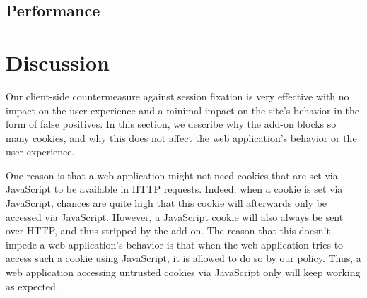 \subsection{Performance}\label{performance}

\section{Discussion}\label{discussion}

Our client-side countermeasure against session fixation is very effective with no impact on the user experience and a minimal impact on the site’s behavior in the form of false positives. In this section, we describe why the add-on blocks so many cookies, and why this does not affect the web application's behavior or the user experience.

One reason is that a web application might not need cookies that are set via JavaScript to be available in HTTP requests. Indeed, when a cookie is set via JavaScript, chances are quite high that this cookie will afterwards only be accessed via JavaScript.  However, a JavaScript cookie will also always be sent over HTTP, and thus stripped by the add-on. The reason that this doesn't impede a web application's behavior is that when the web application tries to access such a cookie using JavaScript, it is allowed to do so by our policy. Thus, a web application accessing untrusted cookies via JavaScript only will keep working as expected.

